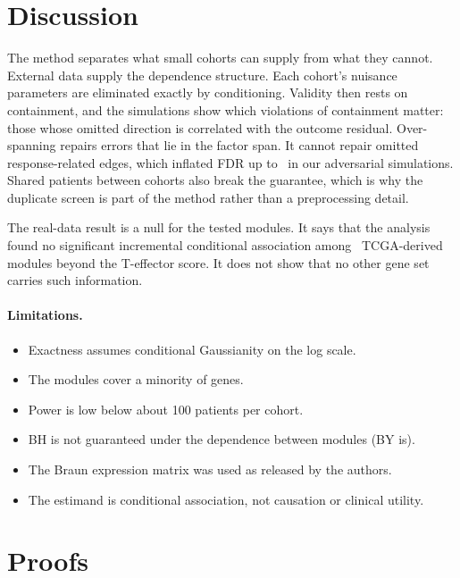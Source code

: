 \documentclass[10pt,twocolumn,letterpaper]{article}
\theoremstyle{remark}
\begin{document}
\section{Discussion}

The method separates what small cohorts can supply from what they cannot. External data supply the dependence structure. Each cohort's nuisance parameters are eliminated exactly by conditioning. Validity then rests on containment, and the simulations show which violations of containment matter: those whose omitted direction is correlated with the outcome residual. Over-spanning repairs errors that lie in the factor span. It cannot repair omitted response-related edges, which inflated FDR up to \advNewDropHi\ in our adversarial simulations. Shared patients between cohorts also break the guarantee, which is why the duplicate screen is part of the method rather than a preprocessing detail.

The real-data result is a null for the tested modules. It says that the analysis found no significant incremental conditional association among \nModules\ TCGA-derived modules beyond the T-effector score. It does not show that no other gene set carries such information.

\paragraph{Limitations.}
\begin{itemize}
  \item Exactness assumes conditional Gaussianity on the log scale.
  \item The modules cover a minority of genes.
  \item Power is low below about 100 patients per cohort.
  \item BH is not guaranteed under the dependence between modules (BY is).
  \item The Braun expression matrix was used as released by the authors.
  \item The estimand is conditional association, not causation or clinical utility.
\end{itemize}



\appendix
\onecolumn
\section{Proofs}\label{app:proofs}
\end{document}
